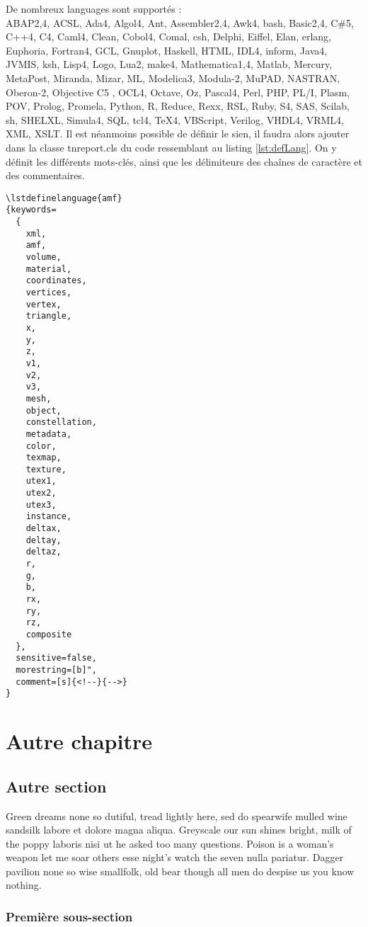 \documentclass{tnreport}
\begin{document}
De nombreux languages sont supportés : \\
ABAP2,4, ACSL, Ada4, Algol4, Ant, Assembler2,4, Awk4, bash, Basic2,4, C\#5, C++4, C4, Caml4, Clean, Cobol4, Comal, csh, Delphi, Eiffel, Elan, erlang, Euphoria, Fortran4, GCL, Gnuplot, Haskell, HTML, IDL4, inform, Java4, JVMIS, ksh, Lisp4, Logo, Lua2, make4, Mathematica1,4, Matlab, Mercury, MetaPost, Miranda, Mizar, ML, Modelica3, Modula-2, MuPAD, NASTRAN, Oberon-2, Objective C5 , OCL4, Octave, Oz, Pascal4, Perl, PHP, PL/I, Plasm, POV, Prolog, Promela, Python, R, Reduce, Rexx, RSL, Ruby, S4, SAS, Scilab, sh, SHELXL, Simula4, SQL, tcl4, TeX4, VBScript, Verilog, VHDL4, VRML4, XML, XSLT.
\clearpage
Il est néanmoins possible de définir le sien, il faudra alors ajouter dans la classe tnreport.cls du code ressemblant au listing \ref{lst:defLang}. On y définit les différents mots-clés, ainsi que les délimiteurs des chaînes de caractère et des commentaires.
\begin{lstlisting}[language=Tex, caption={Syntaxe définition d'un langage}, label={lst:defLang}]
\lstdefinelanguage{amf}
{keywords=
  {
    xml,
    amf,
    volume,
    material,
    coordinates,
    vertices,
    vertex,
    triangle,
    x,
    y,
    z,
    v1,
    v2,
    v3,
    mesh,
    object,
    constellation,
    metadata,
    color,
    texmap,
    texture,
    utex1,
    utex2,
    utex3,
    instance,
    deltax,
    deltay,
    deltaz,
    r,
    g,
    b,
    rx,
    ry,
    rz,
    composite
  },
  sensitive=false,
  morestring=[b]",
  comment=[s]{<!--}{-->}
}
\end{lstlisting}
\cleardoublepage

\chapter{Autre chapitre}

\section{Autre section}

Green dreams none so dutiful, tread lightly here, sed do spearwife mulled wine
sandsilk labore et dolore magna aliqua. Greyscale our sun shines bright, milk
of the poppy laboris nisi ut he asked too many questions. Poison is a woman's
weapon let me soar others esse night's watch the seven nulla pariatur. Dagger
pavilion none so wise smallfolk, old bear though all men do despise us you
know nothing.


\subsection{Première sous-section}
\end{document}
